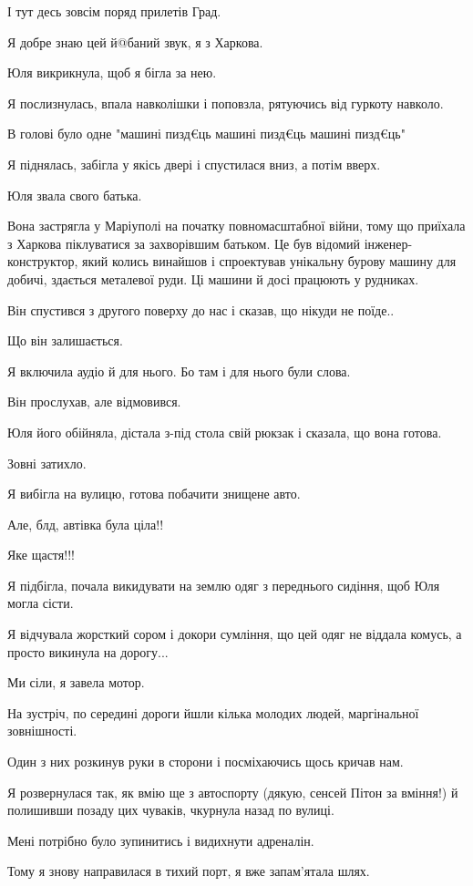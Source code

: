 І тут десь зовсім поряд прилетів Град.

Я добре знаю цей й@баний звук, я з Харкова. 

Юля викрикнула, щоб я бігла за нею.

Я послизнулась, впала навколішки і поповзла, рятуючись від гуркоту навколо.

В голові було одне "машині пизд€ць машині пизд€ць машині пизд€ць"

Я піднялась, забігла у якісь двері і спустилася вниз, а потім вверх. 

Юля звала свого батька.

Вона застрягла у Маріуполі на початку повномасштабної війни, тому що приїхала з
Харкова піклуватися за захворівшим батьком. Це був відомий інженер-конструктор,
який колись винайшов і спроектував  унікальну бурову машину для добичі,
здається металевої руди. Ці машини й досі працюють у рудниках.

Він спустився з другого поверху до нас і сказав, що нікуди не поїде..

Що він залишається. 

Я включила аудіо й для нього. Бо там і для нього були слова. 

Він прослухав, але відмовився. 

Юля його обійняла, дістала з-під стола свій рюкзак і сказала,  що вона готова.

Зовні затихло.

Я вибігла на вулицю, готова побачити знищене авто.

Але, блд, автівка була ціла!!

Яке щастя!!!

Я підбігла, почала викидувати на землю одяг з переднього сидіння, щоб Юля могла
сісти.

Я відчувала жорсткий сором і докори сумління, що цей одяг не віддала комусь, а
просто викинула на дорогу...

Ми сіли, я завела мотор.

На зустріч, по середині дороги йшли кілька молодих людей, маргінальної
зовнішності.

Один з них розкинув руки в сторони і посміхаючись щось кричав нам.

Я розвернулася так, як вмію ще з автоспорту (дякую, сенсей Пітон за вміння!) й
полишивши позаду цих чуваків, чкурнула назад по вулиці.

Мені потрібно було зупинитись і видихнути адреналін.

Тому я знову направилася в тихий порт, я вже запам'ятала шлях.

